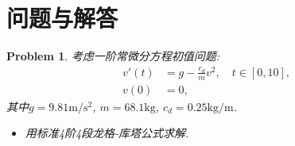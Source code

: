 \documentclass[a4paper, 12pt]{ctexart}
\title{\TITLE}
\author{\AUTHOR}
\date{\today}
\theoremstyle{plain}
\newtheorem{problem}{Problem}[section]
\theoremstyle{plain}
\theoremstyle{plain}
\theoremstyle{nonumberplain}
\begin{document}

    \maketitle
    \thispagestyle{empty}



    \newpage
    \tableofcontents


    \newpage
    \pagestyle{fancy}
    \linenumbers

    \section{问题与解答}

    \begin{problem}
        \label{problem: 1}
        考虑一阶常微分方程初值问题:
        \begin{equation}
            \label{equation: problem1}
            \begin{aligned}
                v'(t) &= g - \frac{c_{d}}{m}v^{2},\quad t\in [0, 10],\\
                v(0) &= 0,
            \end{aligned}
        \end{equation}
        其中$g=9.81\mathrm{m/s^{2}}$, $m=68.1\mathrm{kg}$, $c_{d}=0.25\mathrm{kg/m}$.

        \begin{itemize}
            \item 用标准4阶4段龙格-库塔公式求解.
        \end{itemize}
    \end{problem}
\end{document}

